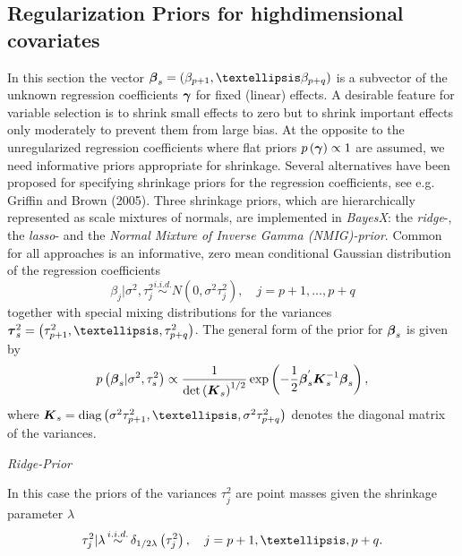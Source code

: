 \documentclass[11pt,a4paper,twoside]{bayesxarticle}
\begin{document}
\subsection{Regularization Priors for highdimensional covariates}
\label{Regularization Priors for highdimensional covariates}

In this section the vector $\betavec _{s} =\left(\beta _{p+1} ,\ldots\beta _{p+q} \right)$ is a subvector of the unknown regression
coefficients $\boldsymbol{\gamma}$ for fixed (linear) effects. A desirable feature for variable selection is to shrink small effects to
zero but to shrink important effects only moderately to prevent them from large bias. At the opposite to the unregularized
regression coefficients where flat priors $p \left(\boldsymbol{\gamma} \right)\propto 1$ are assumed, we need informative priors
appropriate for shrinkage. Several alternatives have been proposed for specifying shrinkage priors for the regression
coefficients, see e.g. Griffin and Brown (2005). Three shrinkage priors, which are hierarchically represented as scale mixtures
of normals, are implemented in {\em BayesX}: the {\em ridge}-, the {\em lasso}- and the {\em Normal Mixture of Inverse
Gamma (NMIG)-prior}. Common for all approaches is an informative, zero mean conditional Gaussian distribution of the regression
coefficients
\[\beta _{j} |\sigma^2,\tau _{j}^{2} \mathop{\sim }\limits^{i.i.d.} N\left(0,\sigma^2\tau _{j}^{2}
\right),\quad j=p+1,\ldots,p+q\]
together with special mixing distributions for the variances $\tauvec_{s}^{2} =\left( \tau _{p+1}^{2} ,\ldots,\tau _{p+q}^{2}
\right)$. The general form of the prior for $\boldsymbol{\beta}_{s} $ is given by
\begin{equation}
\label{ZEqnNum341486}
p\left(\betavec_{s} |\sigma^2,\tau _{s}^{2} \right)\propto \frac{1}{\det \left(\mK_{s} \right)^{{1
\mathord{\left/ {\vphantom {1 2}} \right. \kern-\nulldelimiterspace} 2} } } \exp
\left(-\frac{1}{2} \betavec_{s} ^{{'} } \mK_{s}^{-1} \betavec_{s} \right),
\end{equation}
where $\mK_{s} = \diag\left(\sigma^2\tau _{p+1}^{2} ,\ldots,\sigma^2\tau _{p+q}^{2} \right)$ denotes the diagonal matrix of the variances.

{\em Ridge-Prior}

In this case the priors of the variances $\tau _{j}^{2} $ are point masses
given the shrinkage parameter $\lambda $
\begin{equation}
\label{ZEqnNum108379}
\tau _{j}^{2} |\lambda \mathop{\sim }\limits^{i.i.d.} \delta _{{1\mathord{\left/
{\vphantom {1 2\lambda }} \right. \kern-\nulldelimiterspace} 2\lambda } } \left(
\tau _{j}^{2} \right),\quad j=p+1,\ldots,p+q.
\end{equation}
\end{document}
